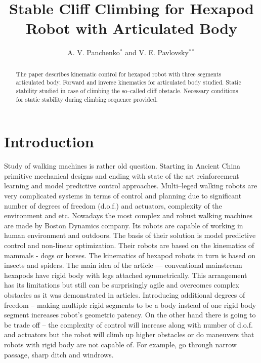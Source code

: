 \documentclass{ws-procs9x6}
\begin{document}
\title{Stable Cliff Climbing for Hexapod Robot with Articulated Body}

\author{A. V. Panchenko$^*$ and V. E. Pavlovsky$^{**}$}

\address{Faculty of Mechanics and Mathematics, Lomonosov Moscow State University,\\
Moscow, 119991, Russia\\
$^*$E-mail: PanchenkoAV@vap.ru\\
$^{**}$E-mail: vlpavl@mail.ru}

\begin{abstract}
The paper describes kinematic control for hexapod robot with three segments articulated body. Forward and inverse kinematics for articulated body studied. Static stability studied in case of climbing the so--called cliff obstacle. Necessary conditions for static stability during climbing sequence provided.
\end{abstract}


\bodymatter

\section{Introduction}\label{aba:intoduction}
Study of walking machines is rather old question. Starting in 
Ancient China primitive mechanical designs\cite{yan2005historical} and ending with state of the art reinforcement learning \cite{peng2017deeploco} and model predictive control approaches\cite{diedam2008online}. Multi--leged walking robots are very complicated systems in terms of control and planning due to significant number of degrees of freedom (d.o.f.) and actuators, complexity of the environment and etc. Nowadays the most complex and robust walking machines are made by Boston Dynamics company\cite{raibert2008bigdog}. Its robots are capable of working in human environment and outdoors. The basis of their solution is model predictive control and non-linear optimization. Their robots are based on the kinematics of mammals - dogs or horses. The kinematics of hexapod robots in turn is based on insects and spiders.
The main idea of the article –-- conventional mainstream hexapods have rigid body with legs attached symmetrically. This arrangement has its limitations but still can be surprisingly agile and overcomes complex obstacles as it was demonstrated in articles\cite{golubev2008control,golubev2009motion,golubev2013motion}. Introducing additional degrees of freedom – making multiple rigid segments to be a body instead of one rigid body segment increases robot’s geometric patency. On the other hand there is going to be trade off – the complexity of control will increase\cite{panchenko2016control} along with number of d.o.f. and actuators but the robot will climb up higher obstacles or do maneuvers that robots with rigid body are not capable of. For example, go through narrow passage, sharp ditch and windrows.
\end{document}
